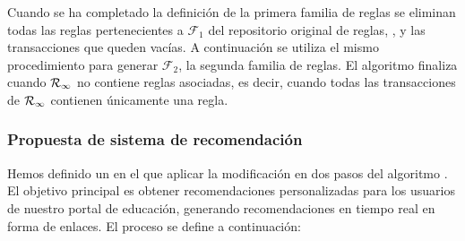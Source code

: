 Cuando se ha completado la definición de la primera familia de reglas se eliminan todas las reglas pertenecientes a $\mathcal{F}_1$ del repositorio original de reglas, \R, y las transacciones que queden vacías. A continuación se utiliza el mismo procedimiento para generar $\mathcal{F}_2$, la segunda familia de reglas. El algoritmo finaliza cuando $\R_\infty$ no contiene reglas asociadas, es decir, cuando todas las transacciones de $\R_\infty$ contienen únicamente una regla.



\subsubsection{Propuesta de sistema de recomendación}
Hemos definido un \sr en el que aplicar la modificación en dos pasos del algoritmo \apriori. El objetivo principal es obtener recomendaciones personalizadas para los usuarios de nuestro portal de educación, generando recomendaciones en tiempo real en forma de enlaces. El proceso se define a continuación:

